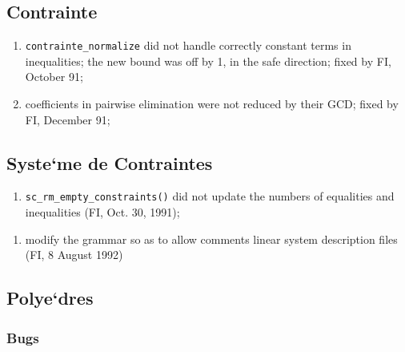 \subsection{Contrainte}

\begin{enumerate}

  \item \verb+contrainte_normalize+ did not handle correctly constant terms
in inequalities; the new bound was off by 1, in the safe direction; fixed
by FI, October 91;

  \item coefficients in pairwise elimination were not reduced by their
        GCD; fixed by FI, December 91;

\end{enumerate}

\subsection{Syste`me de Contraintes}

\begin{enumerate}

  \item \verb+sc_rm_empty_constraints()+ did not update the numbers of
        equalities and inequalities (FI, Oct. 30, 1991);

\end{enumerate}

\begin{enumerate}

  \item modify the grammar so as to allow comments linear system
        description files (FI, 8 August 1992)

\end{enumerate}

\subsection{Polye`dres}

\subsubsection{Bugs}

